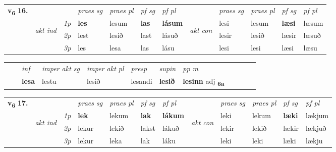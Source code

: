 \begin{tabular}{llllllllllll} \toprule
\multirow{4}{*}{{{\textbf{v{\textsubscript{6}}} \Large{\textbf{16.}}}}}  & &   &  \textit{praes sg}  & \textit{praes pl}  &\textit{ pf sg} & \textit{pf pl} &  &  \textit{praes sg}  & \textit{praes pl}  & \textit{pf sg} & \textit{pf pl } \\*
	\cmidrule{4-7} \cmidrule{9-12}
 & \multirow{3}{*}{\begin{turn}{90}\textit{akt ind}\end{turn}} & {\textit{1p}} & \textbf{les} & lesum    & \textbf{las} & \textbf{lásum} & \multirow{3}{*}{\begin{turn}{90}\textit{akt con}\end{turn}} &lesi & lesum & \textbf{læsi} & læsum\\*
& &  {\textit{2p}} &  lest  & lesið   & last & lásuð & & lesir & lesið & læsir & læsuð \\*
& &  {\textit{3p}} & les & lesa   & las & lásu & & lesi & lesi& læsi & læsu  \\*
\cmidrule{4-7} \cmidrule{9-12}
\end{tabular}


\begin{tabular}{llllllllllll}
 & & \textit{inf} & \textit{imper akt sg} & \textit{imper akt pl}   & \textit{presp} & \textit{supin}  & \textit{pp m}     \\*
  & & \textbf{lesa} & lestu  & lesið   & lesandi &  \textbf{lesið}  & \textbf{lesinn} adj \textbf{\textsubscript{6a}} \\*
\cmidrule{1-12}
\end{tabular}



\begin{tabular}{llllllllllll} \toprule
\multirow{4}{*}{{{\textbf{v{\textsubscript{6}}} \Large{\textbf{17.}}}}}  & &   &  \textit{praes sg}  & \textit{praes pl}  &\textit{ pf sg} & \textit{pf pl} &  &  \textit{praes sg}  & \textit{praes pl}  & \textit{pf sg} & \textit{pf pl } \\*
	\cmidrule{4-7} \cmidrule{9-12}
 & \multirow{3}{*}{\begin{turn}{90}\textit{akt ind}\end{turn}} & {\textit{1p}} & \textbf{lek} & lekum    & \textbf{lak} & \textbf{lákum} & \multirow{3}{*}{\begin{turn}{90}\textit{akt con}\end{turn}} &leki & lekum & \textbf{læki} & lækjum\\*
& &  {\textit{2p}} &  lekur  & lekið   & lakst & lákuð & & lekir & lekið & lækir & lækjuð \\*
& &  {\textit{3p}} & lekur & leka   & lak & láku & & leki & leki& læki & lækju  \\*
\cmidrule{4-7} \cmidrule{9-12}
\end{tabular}


